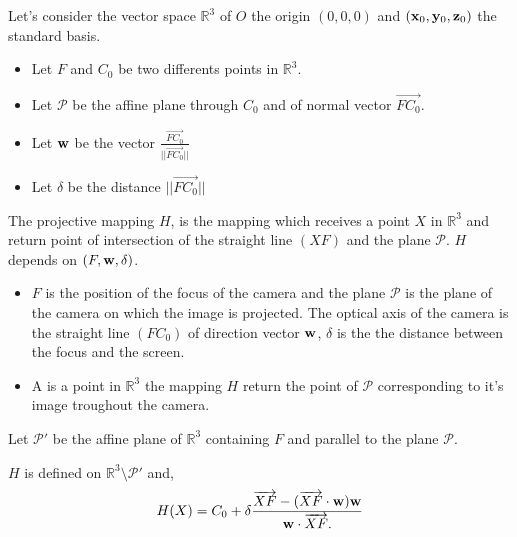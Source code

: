 Let's consider the vector space $\mathbb{R}^{3}$  of $O$ the origin $(0,0,0)$  and $(\mathbf{x}_0,\mathbf{y}_0,\mathbf{z}_0)$ the standard basis.
\begin{itemize}
\item Let $F$ and $C_0$ be two differents points in $\mathbb{R}^{3}$.
\item Let $\mathcal{P}$ be the affine plane through $C_0$ and of normal vector $\overrightarrow{FC_0}$.
\item Let $\mathbf{w}$ be the vector $\frac{\overrightarrow{FC_0}}{|| \overrightarrow{FC_0}||}$
\item Let $\delta$ be the distance $|| \overrightarrow{FC_0}||$
\end{itemize}
\begin{Def}
The projective mapping $H$, is the mapping which receives a point $X$ in $\mathbb{R}^{3}$ and return point of intersection of the straight line $(XF)$ and the plane $\mathcal{P}$. $H$ depends on $(F,\mathbf{w},\delta)$.
\end{Def}
\begin{remarques}
\begin{itemize}
\item $F$ is the position of the focus of the camera and the plane $\mathcal{P}$ is the plane of the camera on which the image is projected. The optical axis of the camera is the straight line $(FC_0)$ of direction vector $\mathbf{w}$, $\delta$ is the the distance between the focus and the screen.
\item A is a point in $\mathbb{R}^3$  the mapping $H$ return the point of $\mathcal{P}$ corresponding to it's image troughout the camera.
\end{itemize}
\end{remarques}
Let $\mathcal{P}'$ be the affine plane of $\mathbb{R}^{3}$ containing $F$ and parallel to the plane $\mathcal{P}$.
\begin{lem}
$H$ is defined on $\mathbb{R}^3 \setminus \mathcal{P}'$ and,
\begin{equation}
H(X) = C_0 +  \delta \frac{\overrightarrow{XF}-(\overrightarrow{XF}\cdot \mathbf{w} )\mathbf{w}}{\mathbf{w} \cdot \overrightarrow{XF}.} 
\label{formul_lem_app_proj}
\end{equation}
\label{lem_app_proj}
\end{lem}
